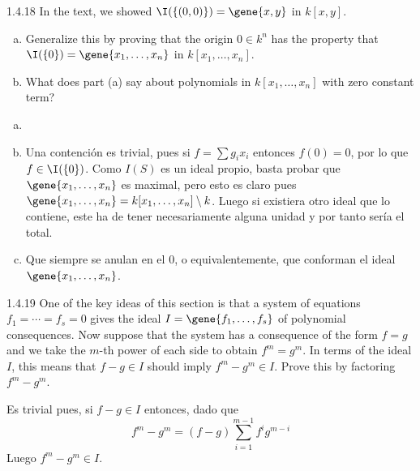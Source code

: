 \documentclass[twoside]{article}
\begin{document}
\newpage

\begin{ejercicio}{1.4.18}
In the text, we showed $\I(\{(0,0)\}) = \gene{x,y}$ in $k[x,y]$. 
\begin{enumerate}[a.]
\item Generalize this by proving that the origin $0\in k^n$ has the property that $\I(\{0\}) = \gene{x_1,\dotsc,x_n}$ in $k[x_1,\dotsc,x_n]$.
\item What does part (a) say about polynomials in $k[x_1,\dotsc,x_n]$ with zero constant term?
\end{enumerate}
\end{ejercicio}
\begin{solucion}
\begin{enumerate}[a.]
\item[]
\item Una contención es trivial, pues si $f= \sum g_i x_i$ entonces  $f(0)=0$, por lo que $f\in \I(\{0\})$. Como $I(S)$ es un ideal propio, basta probar que $\gene{x_1,\dotsc,x_n}$ es maximal, pero esto es claro pues $\gene{x_1,\dotsc,x_n} = k[x_1,\dotsc,x_n]\setminus k$. Luego si existiera otro ideal que lo contiene, este ha de tener necesariamente alguna unidad y por tanto sería el total.
\item Que siempre se anulan en el 0, o equivalentemente, que conforman el ideal $\gene{x_1,\dotsc,x_n}$.

\end{enumerate}
\end{solucion}
\newpage


\begin{ejercicio}{1.4.19}
One of the key ideas of this section is that a system of equations $f_1 =\cdots = f_s = 0$ gives the ideal $I = \gene{ f_1,\dotsc, f_s}$ of polynomial consequences. Now suppose that the system has a consequence of the form $f = g$ and we take the $m$-th power of each side to obtain $f^m = g^m$. In terms of the ideal $I$, this means that $f − g ∈ I$ should imply $f^m − g^m ∈ I$. Prove this by factoring $f^m − g^m$.
\end{ejercicio}
\begin{solucion}
Es trivial pues, si $f-g\in I$ entonces, dado que
$$
f^m-g^m = (f-g)\sum_{i=1}^{m-1}f^ig^{m-i}
$$
Luego $f^m-g^m \in I$.
\end{solucion}
\end{document}
